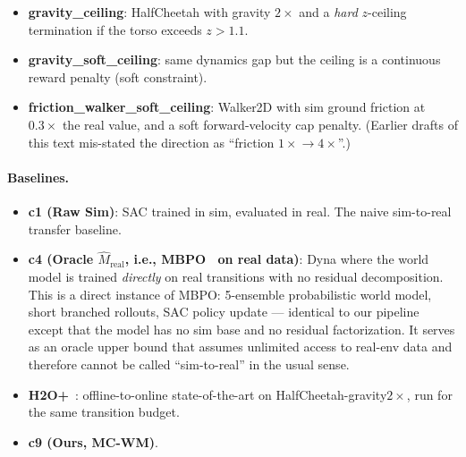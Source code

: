 \documentclass{article}
\theoremstyle{definition}
\begin{document}
\begin{itemize}
\item \textbf{gravity\_ceiling}: HalfCheetah with gravity $2\times$ and
a \emph{hard} $z$-ceiling termination if the torso exceeds $z>1.1$.
\item \textbf{gravity\_soft\_ceiling}: same dynamics gap but the ceiling
is a continuous reward penalty (soft constraint).
\item \textbf{friction\_walker\_soft\_ceiling}: Walker2D with sim
ground friction at $0.3\times$ the real value, and a soft
forward-velocity cap penalty.  (Earlier drafts of this text mis-stated
the direction as ``friction $1\!\times\!\to\!4\!\times$''.)
\end{itemize}

\paragraph{Baselines.}
\begin{itemize}
\item \textbf{c1 (Raw Sim)}: SAC trained in sim, evaluated in real.  The
naive sim-to-real transfer baseline.
\item \textbf{c4 (Oracle $\hat M_{\mathrm{real}}$, i.e., MBPO~\cite{mbpo2019} on real data)}:
Dyna where the world model is trained \emph{directly} on real
transitions with no residual decomposition.  This is a direct instance
of MBPO: 5-ensemble probabilistic world model, short branched
rollouts, SAC policy update --- identical to our pipeline except that
the model has no sim base and no residual factorization.  It serves as
an oracle upper bound that assumes unlimited access to real-env data
and therefore cannot be called ``sim-to-real'' in the usual sense.
\item \textbf{H2O+}~\cite{h2oplus}: offline-to-online state-of-the-art on
HalfCheetah-gravity$2\times$, run for the same transition budget.
\item \textbf{c9 (Ours, MC-WM)}.
\end{itemize}
\end{document}
